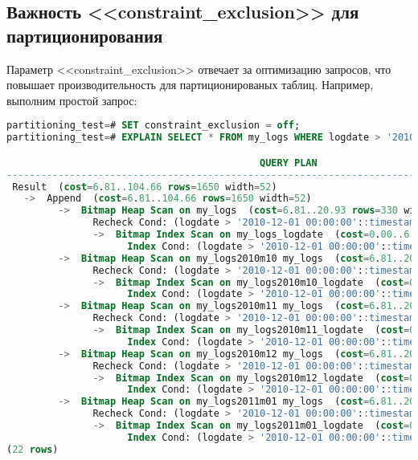 \subsection{Важность <<constraint\_exclusion>> для партиционирования}
Параметр <<constraint\_exclusion>> отвечает за оптимизацию запросов, что повышает производительность для 
партиционированых таблиц. Например, выполним простой запрос:
\begin{lstlisting}[language=SQL,label=lst:partitioning14,caption=<<constraint\_exclusion>> OFF]
partitioning_test=# SET constraint_exclusion = off;
partitioning_test=# EXPLAIN SELECT * FROM my_logs WHERE logdate > '2010-12-01';

                                            QUERY PLAN                                             
---------------------------------------------------------------------------------------------------
 Result  (cost=6.81..104.66 rows=1650 width=52)
   ->  Append  (cost=6.81..104.66 rows=1650 width=52)
         ->  Bitmap Heap Scan on my_logs  (cost=6.81..20.93 rows=330 width=52)
               Recheck Cond: (logdate > '2010-12-01 00:00:00'::timestamp without time zone)
               ->  Bitmap Index Scan on my_logs_logdate  (cost=0.00..6.73 rows=330 width=0)
                     Index Cond: (logdate > '2010-12-01 00:00:00'::timestamp without time zone)
         ->  Bitmap Heap Scan on my_logs2010m10 my_logs  (cost=6.81..20.93 rows=330 width=52)
               Recheck Cond: (logdate > '2010-12-01 00:00:00'::timestamp without time zone)
               ->  Bitmap Index Scan on my_logs2010m10_logdate  (cost=0.00..6.73 rows=330 width=0)
                     Index Cond: (logdate > '2010-12-01 00:00:00'::timestamp without time zone)
         ->  Bitmap Heap Scan on my_logs2010m11 my_logs  (cost=6.81..20.93 rows=330 width=52)
               Recheck Cond: (logdate > '2010-12-01 00:00:00'::timestamp without time zone)
               ->  Bitmap Index Scan on my_logs2010m11_logdate  (cost=0.00..6.73 rows=330 width=0)
                     Index Cond: (logdate > '2010-12-01 00:00:00'::timestamp without time zone)
         ->  Bitmap Heap Scan on my_logs2010m12 my_logs  (cost=6.81..20.93 rows=330 width=52)
               Recheck Cond: (logdate > '2010-12-01 00:00:00'::timestamp without time zone)
               ->  Bitmap Index Scan on my_logs2010m12_logdate  (cost=0.00..6.73 rows=330 width=0)
                     Index Cond: (logdate > '2010-12-01 00:00:00'::timestamp without time zone)
         ->  Bitmap Heap Scan on my_logs2011m01 my_logs  (cost=6.81..20.93 rows=330 width=52)
               Recheck Cond: (logdate > '2010-12-01 00:00:00'::timestamp without time zone)
               ->  Bitmap Index Scan on my_logs2011m01_logdate  (cost=0.00..6.73 rows=330 width=0)
                     Index Cond: (logdate > '2010-12-01 00:00:00'::timestamp without time zone)
(22 rows)
\end{lstlisting}

